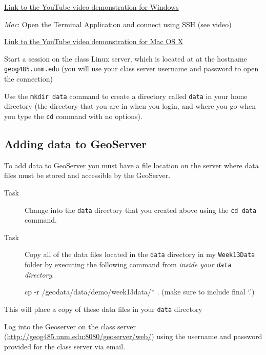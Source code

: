 \documentclass[]{book}
\providecommand{\tightlist}{%
  \setlength{\itemsep}{0pt}\setlength{\parskip}{0pt}}
\begin{document}
\href{http://youtu.be/GdO_n89mey8}{Link to the YouTube video
demonstration for Windows}

\emph{Mac}: Open the Terminal Application and connect using SSH (see
video)

\href{http://youtu.be/Gu_ij6HxTWo}{Link to the YouTube video
demonstration for Mac OS X}

Start a session on the class Linux server, which is located at at the
hostname \texttt{geog485.unm.edu} (you will use your class server
username and password to open the connection)

\begin{description}
\tightlist
\item[Task]
Use the \texttt{mkdir\ data} command to create a directory called
\texttt{data} in your home directory (the directory that you are in when
you login, and where you go when you type the \texttt{cd} command with
no options).
\end{description}

\subsection{Adding data to GeoServer}\label{adding-data-to-geoserver}

To add data to GeoServer you must have a file location on the server
where data files must be stored and accessible by the GeoServer.

\begin{description}
\item[Task]
Change into the \texttt{data} directory that you created above using the
\texttt{cd\ data} command.
\item[Task]
Copy all of the data files located in the \texttt{data} directory in my
\texttt{Week13Data} folder by executing the following command from
\emph{inside your \texttt{data} directory}.

cp -r /geodata/data/demo/week13data/* . (make sure to include final `.')
\end{description}

This will place a copy of these data files in your \texttt{data}
directory

\begin{description}
\tightlist
\item[Task]
Log into the Geoserver on the class server
(\url{http://geog485.unm.edu:8080/geoserver/web/}) using the username
and password provided for the class server via email.
\end{description}
\end{document}
